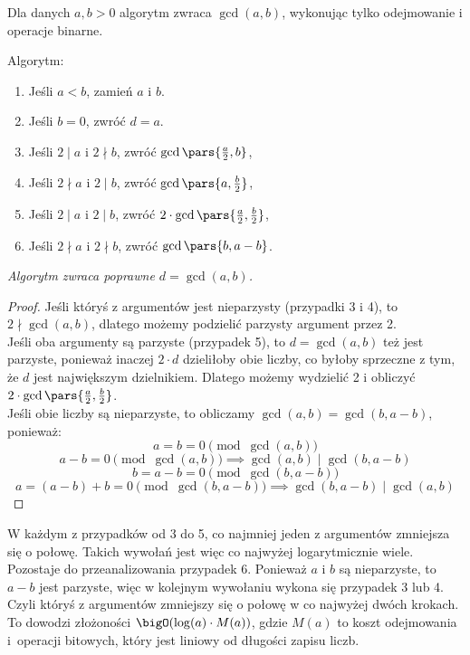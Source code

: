 Dla danych \( a,b > 0 \) algorytm zwraca \( \gcd(a,b) \), wykonując tylko odejmowanie i operacje binarne.

\begin{greyframe}
	Algorytm:
	\begin{enumerate}
		\item Jeśli \( a < b \), zamień \( a \) i \( b \).
		\item Jeśli \( b = 0 \), zwróć \( d = a \).
		\item Jeśli \( 2 \mid a \) i \( 2 \nmid b \), zwróć \( \gcd\pars{\frac{a}{2}, b} \),
		\item Jeśli \( 2 \nmid a \) i \( 2 \mid b \), zwróć \( \gcd\pars{a, \frac{b}{2}} \),
		\item Jeśli \( 2 \mid a \) i \( 2 \mid b \), zwróć \( 2 \cdot \gcd\pars{\frac{a}{2}, \frac{b}{2}} \),
		\item Jeśli \( 2 \nmid a \) i \( 2 \nmid b \), zwróć \( \gcd\pars{b, a - b} \).
	\end{enumerate}
\end{greyframe}

\vspace{1em}\noindent
\textit{Algorytm zwraca poprawne \( d = \gcd(a, b) \).}
\begin{proof}
	Jeśli któryś z argumentów jest nieparzysty (przypadki 3 i 4), to \( 2 \nmid \gcd(a, b) \), dlatego możemy podzielić parzysty argument przez 2. \\
	Jeśli oba argumenty są parzyste (przypadek 5), to \( d = \gcd(a, b) \) też jest parzyste, ponieważ inaczej \( 2 \cdot d \) dzieliłoby obie liczby, co byłoby sprzeczne z tym, że \( d \) jest największym dzielnikiem.
	Dlatego możemy wydzielić 2 i obliczyć \( 2 \cdot \gcd\pars{\frac{a}{2}, \frac{b}{2}} \). \\
	Jeśli obie liczby są nieparzyste, to obliczamy \( \gcd(a, b) = \gcd(b, a - b) \), ponieważ:
	\[
		a = b = 0 \pmod{\gcd(a, b)}
	\]
	\[
		a - b = 0 \pmod{\gcd(a, b)} \implies \gcd(a, b) \mid \gcd(b, a - b)
	\]
	\[
		b = a - b = 0 \pmod{\gcd(b, a - b)}
	\]
	\[
		a = (a - b) + b = 0 \pmod{\gcd(b, a - b)} \implies \gcd(b, a - b) \mid \gcd(a, b)
	\]
\end{proof}

W każdym z przypadków od 3 do 5, co najmniej jeden z argumentów zmniejsza się o połowę. Takich wywołań jest więc co najwyżej logarytmicznie wiele.
Pozostaje do przeanalizowania przypadek 6. Ponieważ \( a \) i \( b \) są nieparzyste, to \( a - b \) jest parzyste, więc w kolejnym wywołaniu wykona się przypadek 3 lub 4. Czyli któryś z argumentów zmniejszy się o połowę w co najwyżej dwóch krokach.
To dowodzi złożoności \( \bigO(\log(a) \cdot M(a)) \), gdzie \( M(a) \) to koszt odejmowania i~operacji bitowych, który jest liniowy od długości zapisu liczb.
